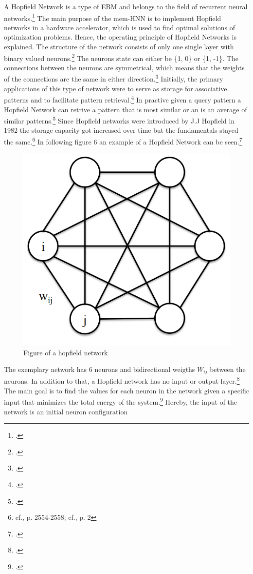 A Hopfield Network is a type of \ac{EBM} and belongs to the field of recurrent neural networks.\footcite[cf.][35]{dramschChapterOne702020}
The main purpose of the \ac{mem-HNN} is to implement Hopfield networks in a hardware accelerator, which is used to find optimal solutions of optimization problems.
Hence, the operating principle of Hopfield Networks is explained. 
The structure of the network consists of only one single layer with binary valued neurons.\footcite[cf.][7]{ahadNeuralNetworksWireless2016}
The neurons state can either be \{1, 0\} or \{1, -1\}.
The connections between the neurons are symmetrical, which means that the weights of the connections are the same in either direction.\footcite[cf.][7]{ahadNeuralNetworksWireless2016}
Initially, the primary applications of this type of network were to serve as storage for associative patterns and to facilitate pattern retrieval.\footcite[cf.][2]{ramsauerHopfieldNetworksAll2021}
In practive given a query pattern a Hopfield Network can retrive a pattern that is most similar or an is an average of similar patterns.\footcite[cf.][2]{ramsauerHopfieldNetworksAll2021}
Since Hopfield networks were introduced by J.J Hopfield in 1982 the storage capacity got increased over time but the fundamentals stayed the same.\footnote{cf.\cite{hopfieldNeuralNetworksPhysical1982}, p. 2554-2558; cf.\cite{ramsauerHopfieldNetworksAll2021}, p. 2}
In following figure 6 an example of a Hopfield Network can be seen.\footcite[cf.][1-2]{yaoMassivelyParallelAssociative2013}
\begin{figure}[H]
    \centering
    \includegraphics[width=0.3\linewidth]{graphics/Hopfield_Netzwerk.png}
    \caption{Figure of a hopfield network}
\end{figure}
The exemplary network has 6 neurons and bidirectional weigths \( W_{ij} \) between the neurons. 
In addition to that, a Hopfield network has no input or output layer.\footcite[cf.][3]{yaoMassivelyParallelAssociative2013}
The main goal is to find the values for each neuron in the network given a specific input that minimizes the total energy of the system.\footcite[cf.][7]{ahadNeuralNetworksWireless2016}
Hereby, the input of the network is an initial neuron configuration
